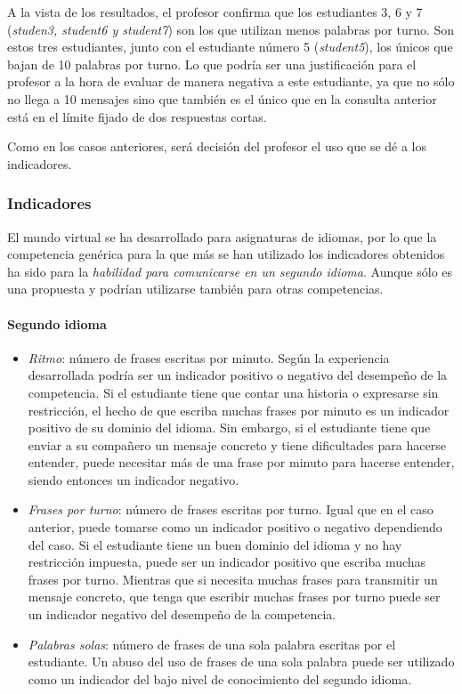 A la vista de los resultados, el profesor confirma que los estudiantes 3, 6 y 7 (\emph{studen3, student6 y student7}) son los que utilizan menos palabras por turno. Son estos tres estudiantes, junto con el estudiante número 5 (\emph{student5}), los únicos que bajan de 10 palabras por turno. Lo que podría ser una justificación para el profesor a la hora de evaluar de manera negativa a este estudiante, ya que no sólo no llega a 10 mensajes sino que también es el único que en la consulta anterior está en el límite fijado de dos respuestas cortas.

Como en los casos anteriores, será decisión del profesor el uso que se dé a los indicadores.

\subsubsection{Indicadores}

El mundo virtual se ha desarrollado para asignaturas de idiomas, por lo que la competencia genérica para la que más se han utilizado los indicadores obtenidos ha sido para la \emph{habilidad para comunicarse en un segundo idioma}. Aunque sólo es una propuesta y podrían utilizarse también para otras competencias.


\paragraph*{Segundo idioma}
\begin{itemize}
\item \emph{Ritmo}: número de frases escritas por minuto. Según la experiencia desarrollada podría ser un indicador positivo o negativo del desempeño de la competencia. Si el estudiante tiene que contar una historia o expresarse sin restricción, el hecho de que escriba muchas frases por minuto es un indicador positivo de su dominio del idioma. Sin embargo, si el estudiante tiene que enviar a su compañero un mensaje concreto y tiene dificultades  para hacerse entender, puede necesitar más de una frase por minuto para hacerse entender, siendo entonces un indicador negativo.
\item \emph{Frases por turno}: número de frases escritas por turno. Igual que en el caso anterior, puede tomarse como un indicador positivo o negativo dependiendo del caso. Si el estudiante tiene un buen dominio del idioma y no hay restricción impuesta, puede ser un indicador positivo que escriba muchas frases por turno. Mientras que si necesita muchas frases para transmitir un mensaje concreto, que tenga que escribir muchas frases por turno puede ser un indicador negativo del desempeño de la competencia.
\item \emph{Palabras solas}: número de frases de una sola palabra escritas por el estudiante. Un abuso del uso de frases de una sola palabra puede ser utilizado como un indicador del bajo nivel de conocimiento del segundo idioma.
\end{itemize}

